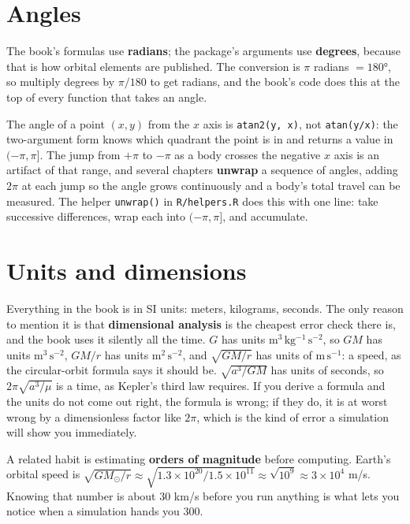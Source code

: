 \documentclass[
  10.5pt,
  letterpaper,
]{scrbook}
\theoremstyle{definition}
\theoremstyle{plain}
\theoremstyle{remark}
\begin{document}
\section{Angles}\label{angles}

The book's formulas use \textbf{radians}; the package's arguments use
\textbf{degrees}, because that is how orbital elements are published.
The conversion is \(\pi\) radians \(= 180°\), so multiply degrees by
\(\pi/180\) to get radians, and the book's code does this at the top of
every function that takes an angle.

The angle of a point \((x, y)\) from the \(x\) axis is
\texttt{atan2(y,\ x)}, not \texttt{atan(y/x)}: the two-argument form
knows which quadrant the point is in and returns a value in
\((-\pi, \pi]\). The jump from \(+\pi\) to \(-\pi\) as a body crosses
the negative \(x\) axis is an artifact of that range, and several
chapters \textbf{unwrap} a sequence of angles, adding \(2\pi\) at each
jump so the angle grows continuously and a body's total travel can be
measured. The helper \texttt{unwrap()} in \texttt{R/helpers.R} does this
with one line: take successive differences, wrap each into
\((-\pi, \pi]\), and accumulate.

\section{Units and dimensions}\label{units-and-dimensions}

Everything in the book is in SI units: meters, kilograms, seconds. The
only reason to mention it is that \textbf{dimensional analysis} is the
cheapest error check there is, and the book uses it silently all the
time. \(G\) has units \(\mathrm{m^3\,kg^{-1}\,s^{-2}}\), so \(GM\) has
units \(\mathrm{m^3\,s^{-2}}\), \(GM/r\) has units
\(\mathrm{m^2\,s^{-2}}\), and \(\sqrt{GM/r}\) has units of
\(\mathrm{m\,s^{-1}}\): a speed, as the circular-orbit formula says it
should be. \(\sqrt{a^3/GM}\) has units of seconds, so
\(2\pi\sqrt{a^3/\mu}\) is a time, as Kepler's third law requires. If you
derive a formula and the units do not come out right, the formula is
wrong; if they do, it is at worst wrong by a dimensionless factor like
\(2\pi\), which is the kind of error a simulation will show you
immediately.

A related habit is estimating \textbf{orders of magnitude} before
computing. Earth's orbital speed is
\(\sqrt{GM_\odot/r} \approx \sqrt{1.3\times10^{20}/1.5\times10^{11}} \approx \sqrt{10^9} \approx 3\times10^4\)
m/s. Knowing that number is about 30 km/s before you run anything is
what lets you notice when a simulation hands you 300.
\end{document}
